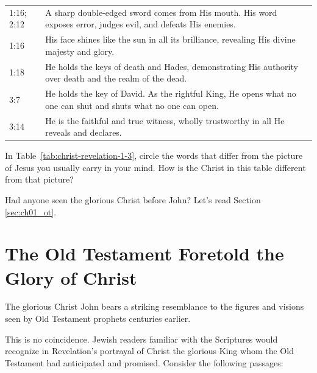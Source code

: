 \begin{longtable}{p{1.2cm} p{7.8cm}}
1:16; 2:12
& A sharp double-edged sword comes from His mouth. His word exposes error, judges evil, and defeats His enemies. \\

1:16
& His face shines like the sun in all its brilliance, revealing His divine majesty and glory. \\

1:18
& He holds the keys of death and Hades, demonstrating His authority over death and the realm of the dead. \\

3:7
& He holds the key of David. As the rightful King, He opens what no one can shut and shuts what no one can open. \\

3:14
& He is the faithful and true witness, wholly trustworthy in all He reveals and declares. \\

\end{longtable}

\begin{ReaderQuestion}
In Table~\ref{tab:christ-revelation-1-3}, circle the words that differ from the picture of Jesus you usually carry in your mind. How is the Christ in this table different from that picture?
\end{ReaderQuestion}

Had anyone seen the glorious Christ before John? Let's read Section \ref{sec:ch01_ot}.

\section{The Old Testament Foretold the Glory of Christ}
\label{sec:ch01_ot}

The glorious Christ John bears a striking resemblance to the figures and visions seen by Old Testament prophets centuries earlier.

This is no coincidence. Jewish readers familiar with the Scriptures would recognize in Revelation's portrayal of Christ the glorious King whom the Old Testament had anticipated and promised. Consider the following passages:


